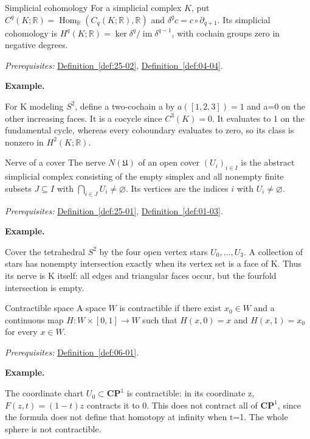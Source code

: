 \documentclass[11pt]{article}
\makeatletter
\newcommand{\R}{\mathbb R}
\newcounter{definition}
\newcommand{\CP}{\mathbf{CP}}
\newcommand{\exampleheading}{\par\medskip\textbf{Example.}\par\smallskip}
\newcommand{\currentdefinition}[1]{\protected@edef\@currentlabel{#1}}
\makeatother
\begin{document}
\begin{definitionbox}{Simplicial cohomology}
\currentdefinition{\thedefinition}
\label{def:25-04}
For a simplicial complex $K$, put $C^q(K;\R)=\operatorname{Hom}_{\R}(C_q(K;\R),\R)$ and $\delta^qc=c\circ\partial_{q+1}$. Its simplicial cohomology is $H^q(K;\R)=\ker\delta^q/\operatorname{im}\delta^{q-1}$, with cochain groups zero in negative degrees.

\smallskip
\textit{Prerequisites:} \hyperref[def:25-02]{Definition~\ref*{def:25-02}}, \hyperref[def:04-04]{Definition~\ref*{def:04-04}}.

\exampleheading
For K modeling $S^2$, define a two-cochain a by $a([1,2,3])=1$ and a=0 on the other increasing faces. It is a cocycle since $C^3(K)=0$. It evaluates to 1 on the fundamental cycle, whereas every coboundary evaluates to zero, so its class is nonzero in $H^2(K;\R)$.
\end{definitionbox}

\begin{definitionbox}{Nerve of a cover}
\currentdefinition{\thedefinition}
\label{def:25-05}
The nerve $N(\mathfrak U)$ of an open cover $(U_i)_{i\in I}$ is the abstract simplicial complex consisting of the empty simplex and all nonempty finite subsets $J\subseteq I$ with $\bigcap_{i\in J}U_i\ne\varnothing$. Its vertices are the indices $i$ with $U_i\ne\varnothing$.

\smallskip
\textit{Prerequisites:} \hyperref[def:25-01]{Definition~\ref*{def:25-01}}, \hyperref[def:01-03]{Definition~\ref*{def:01-03}}.

\exampleheading
Cover the tetrahedral $S^2$ by the four open vertex stars $U_0,\ldots,U_3$. A collection of stars has nonempty intersection exactly when its vertex set is a face of K. Thus its nerve is K itself: all edges and triangular faces occur, but the fourfold intersection is empty.
\end{definitionbox}

\begin{definitionbox}{Contractible space}
\currentdefinition{\thedefinition}
\label{def:25-06}
A space $W$ is contractible if there exist $x_0\in W$ and a continuous map $H:W\times[0,1]\to W$ such that $H(x,0)=x$ and $H(x,1)=x_0$ for every $x\in W$.

\smallskip
\textit{Prerequisites:} \hyperref[def:06-01]{Definition~\ref*{def:06-01}}.

\exampleheading
The coordinate chart $U_0\subset\CP^1$ is contractible: in its coordinate z, $F(z,t)=(1-t)z$ contracts it to 0. This does not contract all of $\CP^1$, since the formula does not define that homotopy at infinity when t=1. The whole sphere is not contractible.
\end{definitionbox}
\end{document}
